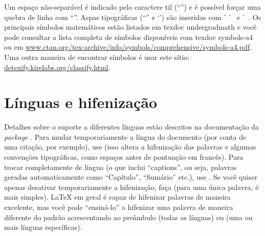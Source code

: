 Um espaço não-separável é indicado pelo caractere til
(``\cmd{\textasciitilde{}}'') e é possível forçar uma quebra de linha com
``\cmd{\sla\sla{}}''. Aspas tipográficas (``\;'' e `\;') são inseridas
com \`\space\,\`\space\space\,\textquotesingle\,\textquotesingle{} e
\`\space\,\,\textquotesingle. Os principais símbolos matemáticos estão
listados em \textsf{texdoc undergradmath} e você pode consultar a lista
completa de símbolos disponíveis com \textsf{texdoc symbols-a4} ou em
\url{www.ctan.org/tex-archive/info/symbols/comprehensive/symbols-a4.pdf}.
Uma outra maneira de encontrar símbolos é usar este sítio:
\url{detexify.kirelabs.org/classify.html}.

\section{Línguas e hifenização}

Detalhes sobre o suporte a diferentes línguas estão descritos na
documentação da \textit{package} . Para mudar temporariamente
a língua do documento (por conta de uma citação, por exemplo), use
 (isso altera a hifenização
das palavras e algumas convenções tipográficas, como espaços antes de
pontuação em francês). Para trocar completamente de língua (o que
inclui ``captions'', ou seja, palavras geradas automaticamente como
``Capítulo'', ``Sumário'' etc.), use .
Se você quiser apenas desativar temporariamente a hifenização, faça
 (para uma única
palavra,  é mais simples). \LaTeX{} em
geral é capaz de hifenizar palavras de maneira excelente, mas você
pode ``ensiná-lo'' a hifenizar uma palavra de maneira diferente do
padrão acrescentando ao preâmbulo  (todas as línguas) ou  (uma ou mais línguas específicas).
